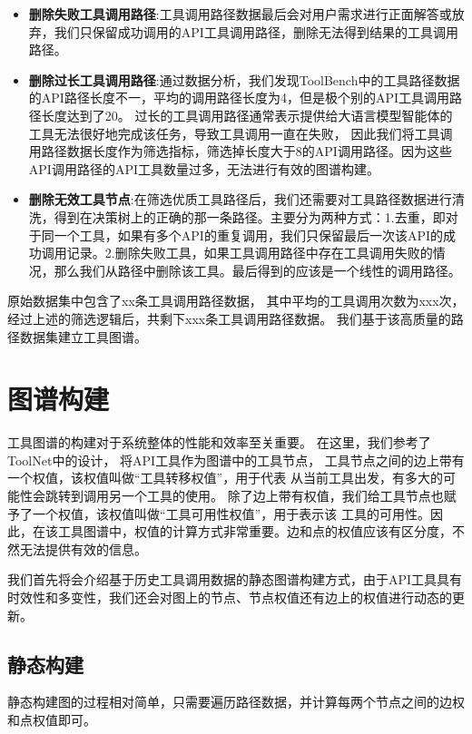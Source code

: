 \begin{itemize}
  \item \textbf{删除失败工具调用路径}:工具调用路径数据最后会对用户需求进行正面解答或放弃，我们只保留成功调用的API工具调用路径，删除无法得到结果的工具调用路径。
  \item \textbf{删除过长工具调用路径}:通过数据分析，我们发现ToolBench中的工具路径数据的API路径长度不一，平均的调用路径长度为4，但是极个别的API工具调用路径长度达到了20。
  过长的工具调用路径通常表示提供给大语言模型智能体的工具无法很好地完成该任务，导致工具调用一直在失败，
  因此我们将工具调用路径数据长度作为筛选指标，筛选掉长度大于8的API调用路径。因为这些API调用路径的API工具数量过多，无法进行有效的图谱构建。
  \item \textbf{删除无效工具节点}:在筛选优质工具路径后，我们还需要对工具路径数据进行清洗，得到在决策树上的正确的那一条路径。主要分为两种方式：1.去重，即对于同一个工具，如果有多个API的重复调用，我们只保留最后一次该API的成功调用记录。2.删除失败工具，如果工具调用路径中存在工具调用失败的情况，那么我们从路径中删除该工具。最后得到的应该是一个线性的调用路径。
\end{itemize}

原始数据集中包含了xx条工具调用路径数据，
其中平均的工具调用次数为xxx次，
经过上述的筛选逻辑后，共剩下xxx条工具调用路径数据。
我们基于该高质量的路径数据集建立工具图谱。

\section{图谱构建}

工具图谱的构建对于系统整体的性能和效率至关重要。
在这里，我们参考了ToolNet\cite{Liu2024}中的设计，
将API工具作为图谱中的工具节点，
工具节点之间的边上带有一个权值，该权值叫做“工具转移权值”，用于代表
从当前工具出发，有多大的可能性会跳转到调用另一个工具的使用。
除了边上带有权值，我们给工具节点也赋予了一个权值，该权值叫做“工具可用性权值”，用于表示该
工具的可用性。因此，在该工具图谱中，权值的计算方式非常重要。边和点的权值应该有区分度，不然无法提供有效的信息。

我们首先将会介绍基于历史工具调用数据的静态图谱构建方式，由于API工具具有时效性和多变性，我们还会对图上的节点、节点权值还有边上的权值进行动态的更新。

\subsection{静态构建}

静态构建图的过程相对简单，只需要遍历路径数据，并计算每两个节点之间的边权和点权值即可。

